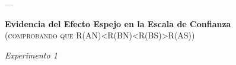 \documentclass[a4paper ]{article}
\begin{document}
\clearpage

















---
\vspace{3mm}
\begin{center}
{\LARGE \textbf{Evidencia del Efecto Espejo en la Escala de Confianza}}\\
{\small \textsc{(comprobando que R(AN)<R(BN)<R(BS)>R(AS))}}\\
\smallskip
\end{center}
\begin{center}
{\LARGE \textit{Experimento 1}}\\
\end{center}
\vspace{3mm}
\end{document}
